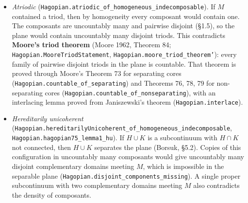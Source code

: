 \documentclass[11pt]{article}
\newcommand{\lean}[1]{\texttt{#1}}
\begin{document}
\begin{itemize}
  \item \emph{Atriodic} (\lean{Hagopian.\hspace{0pt}atriodic\_\hspace{0pt}of\_\hspace{0pt}homogeneous\_\hspace{0pt}indecomposable}). If $M$ contained a triod, then by homogeneity every composant would contain one. The composants are uncountably many and pairwise disjoint (\S{}1.5), so the plane would contain uncountably many disjoint triods. This contradicts \textbf{Moore's triod theorem} (Moore 1962, Theorem 84; \lean{Hagopian.\hspace{0pt}MooreTriodStatement}, \lean{Hagopian.\hspace{0pt}moore\_\hspace{0pt}triod\_\hspace{0pt}theorem'}): every family of pairwise disjoint triods in the plane is countable. That theorem is proved through Moore's Theorem 73 for separating cores (\lean{Hagopian.\hspace{0pt}countable\_\hspace{0pt}of\_\hspace{0pt}separating}) and Theorems 76, 78, 79 for non-separating cores (\lean{Hagopian.\hspace{0pt}countable\_\hspace{0pt}of\_\hspace{0pt}nonseparating}), with an interlacing lemma proved from Janiszewski's theorem (\lean{Hagopian.\hspace{0pt}interlace}).
  \item \emph{Hereditarily unicoherent} (\lean{Hagopian.\hspace{0pt}hereditarilyUnicoherent\_\hspace{0pt}of\_\hspace{0pt}homogeneous\_\hspace{0pt}indecomposable}, \lean{Hagopian.\hspace{0pt}hagopian75\_\hspace{0pt}lemma1\_\hspace{0pt}hu}). If $H \cup K$ is a subcontinuum with $H \cap K$ not connected, then $H \cup K$ separates the plane (Borsuk, \S{}5.2). Copies of this configuration in uncountably many composants would give uncountably many disjoint complementary domains meeting $M$, which is impossible in the separable plane (\lean{Hagopian.\hspace{0pt}disjoint\_\hspace{0pt}components\_\hspace{0pt}missing}). A single proper subcontinuum with two complementary domains meeting $M$ also contradicts the density of composants.
\end{itemize}
\end{document}
